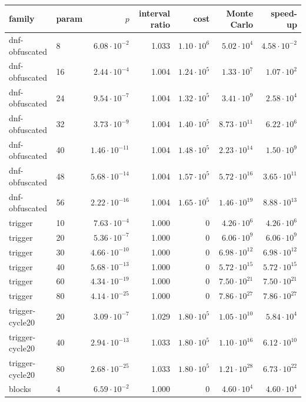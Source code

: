 \begin{tabular}{llrrrrr}
\toprule
family & param & $p$ & interval ratio & cost & Monte Carlo & speed-up\\
\midrule
dnf-obfuscated & 8 & $6.08\cdot10^{-2}$ & 1.033 & $1.10\cdot10^{6}$ & $5.02\cdot10^{4}$ & $4.58\cdot10^{-2}$\\
dnf-obfuscated & 16 & $2.44\cdot10^{-4}$ & 1.004 & $1.24\cdot10^{5}$ & $1.33\cdot10^{7}$ & $1.07\cdot10^{2}$\\
dnf-obfuscated & 24 & $9.54\cdot10^{-7}$ & 1.004 & $1.32\cdot10^{5}$ & $3.41\cdot10^{9}$ & $2.58\cdot10^{4}$\\
dnf-obfuscated & 32 & $3.73\cdot10^{-9}$ & 1.004 & $1.40\cdot10^{5}$ & $8.73\cdot10^{11}$ & $6.22\cdot10^{6}$\\
dnf-obfuscated & 40 & $1.46\cdot10^{-11}$ & 1.004 & $1.48\cdot10^{5}$ & $2.23\cdot10^{14}$ & $1.50\cdot10^{9}$\\
dnf-obfuscated & 48 & $5.68\cdot10^{-14}$ & 1.004 & $1.57\cdot10^{5}$ & $5.72\cdot10^{16}$ & $3.65\cdot10^{11}$\\
dnf-obfuscated & 56 & $2.22\cdot10^{-16}$ & 1.004 & $1.65\cdot10^{5}$ & $1.46\cdot10^{19}$ & $8.88\cdot10^{13}$\\
trigger & 10 & $7.63\cdot10^{-4}$ & 1.000 & $0$ & $4.26\cdot10^{6}$ & $4.26\cdot10^{6}$\\
trigger & 20 & $5.36\cdot10^{-7}$ & 1.000 & $0$ & $6.06\cdot10^{9}$ & $6.06\cdot10^{9}$\\
trigger & 30 & $4.66\cdot10^{-10}$ & 1.000 & $0$ & $6.98\cdot10^{12}$ & $6.98\cdot10^{12}$\\
trigger & 40 & $5.68\cdot10^{-13}$ & 1.000 & $0$ & $5.72\cdot10^{15}$ & $5.72\cdot10^{15}$\\
trigger & 60 & $4.34\cdot10^{-19}$ & 1.000 & $0$ & $7.50\cdot10^{21}$ & $7.50\cdot10^{21}$\\
trigger & 80 & $4.14\cdot10^{-25}$ & 1.000 & $0$ & $7.86\cdot10^{27}$ & $7.86\cdot10^{27}$\\
trigger-cycle20 & 20 & $3.09\cdot10^{-7}$ & 1.029 & $1.80\cdot10^{5}$ & $1.05\cdot10^{10}$ & $5.84\cdot10^{4}$\\
trigger-cycle20 & 40 & $2.94\cdot10^{-13}$ & 1.033 & $1.80\cdot10^{5}$ & $1.10\cdot10^{16}$ & $6.12\cdot10^{10}$\\
trigger-cycle20 & 80 & $2.68\cdot10^{-25}$ & 1.033 & $1.80\cdot10^{5}$ & $1.21\cdot10^{28}$ & $6.73\cdot10^{22}$\\
blocks & 4 & $6.59\cdot10^{-2}$ & 1.000 & $0$ & $4.60\cdot10^{4}$ & $4.60\cdot10^{4}$\\

\end{tabular}
